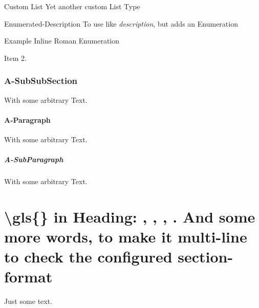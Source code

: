 \npi
\begin{descenum}
	\item[Custom List] Yet another custom List Type
	\item[Enumerated-Description] To use like \textit{description}, but adds an Enumeration
\end{descenum}

\npi
\begin{enuminlrom}
\item%
	Example Inline Roman Enumeration
\item%
	Item 2.
\end{enuminlrom}


\subsubsection{A-SubSubSection}
With some arbitrary Text.

\paragraph{A-Paragraph}
With some arbitrary Text.

\subparagraph{A-SubParagraph}
With some arbitrary Text.





\section{\textbackslash gls\{\} in Heading:
	\texorpdfstring{}{DLL},
	\texorpdfstring{}{DLL},
	\texorpdfstring{}{DLLs},
	\texorpdfstring{}{DLLs}.
	And some more words, to make it multi-line to check the configured section-format
}

Just some text.



\edef\tokenA{\glsentrytext{dll}}
\edef\tokenB{\glsentrydesc{dll}}
